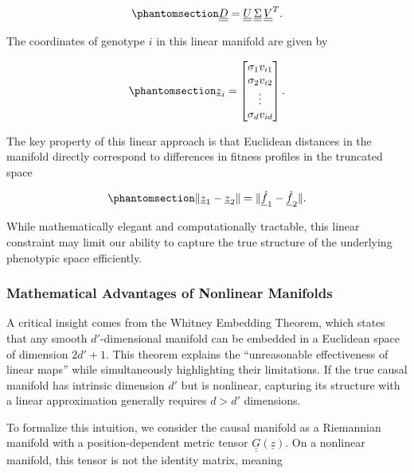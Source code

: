 \documentclass[
]{scrartcl}
\begin{document}
\begin{refsection}
\begin{equation}\phantomsection\label{eq-svd}{
\underline{\underline{D}} = 
\underline{\underline{U}}\, 
\underline{\underline{\Sigma}}\, 
\underline{\underline{V}}^T.
}\end{equation}

The coordinates of genotype \(i\) in this linear manifold are given by

\begin{equation}\phantomsection\label{eq-linear-coords}{
\underline{z}_i = \left[\begin{matrix}
\sigma_1 v_{i1} \\
\sigma_2 v_{i2} \\
\vdots \\
\sigma_d v_{id}
\end{matrix}\right].
}\end{equation}

The key property of this linear approach is that Euclidean distances in
the manifold directly correspond to differences in fitness profiles in
the truncated space

\begin{equation}\phantomsection\label{eq-linear-distance}{
\|\underline{z}_1 - \underline{z}_2\| = 
\|\underline{\hat{f}}_1 - \underline{\hat{f}}_2\|.
}\end{equation}

While mathematically elegant and computationally tractable, this linear
constraint may limit our ability to capture the true structure of the
underlying phenotypic space efficiently.

\subsubsection{Mathematical Advantages of Nonlinear
Manifolds}\label{mathematical-advantages-of-nonlinear-manifolds}

A critical insight comes from the Whitney Embedding Theorem, which
states that any smooth \(d'\)-dimensional manifold can be embedded in a
Euclidean space of dimension \(2d' + 1\). This theorem explains the
``unreasonable effectiveness of linear maps'' while simultaneously
highlighting their limitations. If the true causal manifold has
intrinsic dimension \(d'\) but is nonlinear, capturing its structure
with a linear approximation generally requires \(d > d'\) dimensions.

To formalize this intuition, we consider the causal manifold as a
Riemannian manifold with a position-dependent metric tensor
\(\underline{\underline{G}}(\underline{z})\). On a nonlinear manifold,
this tensor is not the identity matrix, meaning


\end{refsection}
\end{document}
